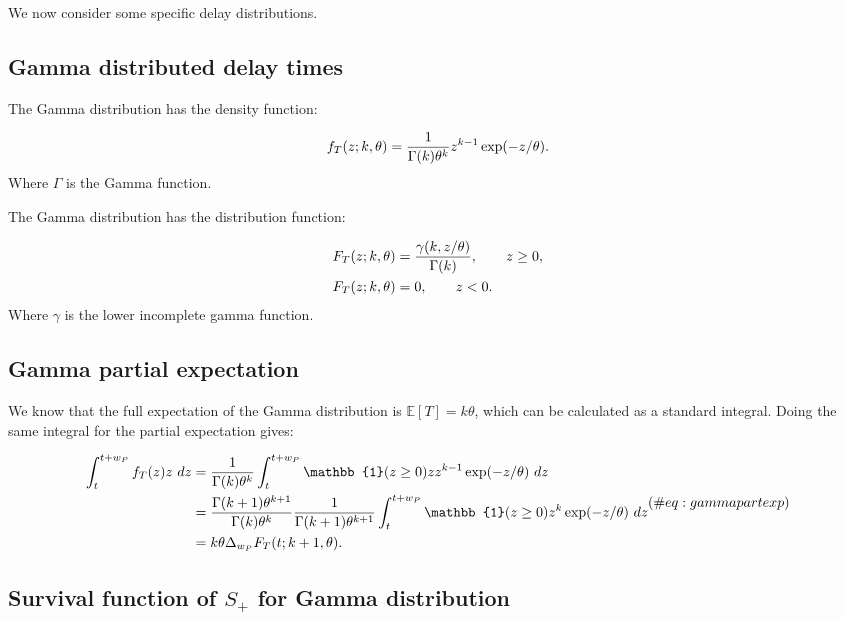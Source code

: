 \documentclass[10pt,letterpaper]{article}
\begin{document}
We now consider some specific delay distributions.

\subsection{Gamma distributed delay times}

The Gamma distribution has the density function:

\begin{equation}
f_T(z;k, \theta) = {1 \over \Gamma(k) \theta^k} z^{k-1} \exp(-z/\theta).
\end{equation}
Where $\Gamma$ is the Gamma function.

The Gamma distribution has the distribution function:

\begin{equation}
\begin{aligned}
F_T(z;k, \theta) &= {\gamma(k, z/\theta) \over \Gamma(k)}, \qquad z\geq 0,\\
F_T(z;k, \theta) &= 0, \qquad z < 0.
\end{aligned}
\end{equation}
Where $\gamma$ is the lower incomplete gamma function.

\subsection{Gamma partial expectation}

We know that the full expectation of the Gamma distribution is $\mathbb{E}[T] = k\theta$, which can be calculated as a standard integral. Doing the same integral for the partial expectation gives:

\begin{equation}
\begin{aligned}
\int_t^{t+w_P} f_T(z) z~ dz &= {1 \over \Gamma(k) \theta^k} \int_t^{t+w_P} \mathbb{1}(z \geq 0)  z  z^{k-1} \exp(-z/\theta)~dz \\
&=  {\Gamma(k+1) \theta^{k+1} \over \Gamma(k) \theta^k}  {1 \over \Gamma(k+1) \theta^{k+1}} \int_t^{t+w_P} \mathbb{1}(z \geq 0)  z^{k}  \exp(-z/\theta)~dz\\
&= k\theta \Delta_{w_P} F_T(t; k + 1, \theta).
\end{aligned} (\#eq:gammapartexp)
\end{equation}

\subsection{Survival function of $S_{+}$ for Gamma distribution}
\end{document}
